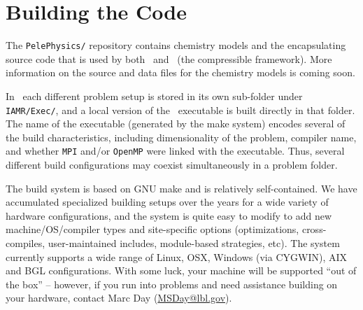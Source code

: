 
\section{Building the Code}

The {\tt PelePhysics/} repository contains chemistry models and the encapsulating source 
code that is used by both \iamr\ and \pelec\ (the compressible framework).  More
information on the source and data files for the chemistry models is coming soon.

In \iamr\ each different problem setup is stored in its own
sub-folder under {\tt IAMR/Exec/}, and a local version of the 
\iamr\ executable is built directly in that folder.  The name of the executable (generated by the make
system) encodes several of the build characteristics, including dimensionality of the problem,
compiler name, and whether {\tt MPI} and/or {\tt OpenMP} were linked with the executable.
Thus, several different build configurations may coexist simultaneously in a problem folder.

The build system is based on GNU make and is relatively self-contained.  We have accumulated 
specialized building setups over the years for a wide variety of hardware configurations, and 
the system is quite easy to modify to add new machine/OS/compiler types and site-specific 
options (optimizations, cross-compiles, user-maintained includes, module-based strategies, etc).
The system currently supports a wide range of Linux, OSX, Windows (via CYGWIN), AIX and BGL 
configurations. With some luck, your machine will be supported ``out of the box'' -- however, if 
you run into problems and need assistance building on your hardware, contact Marc Day (\url{MSDay@lbl.gov}).

